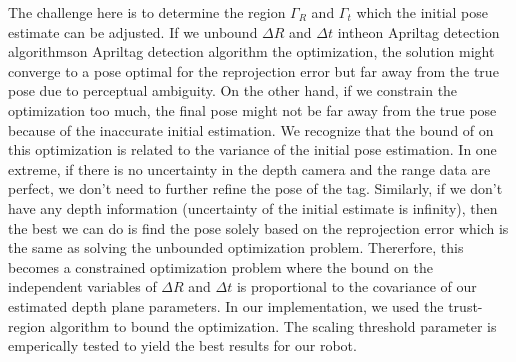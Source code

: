 The challenge here is to determine the region $\Gamma_R$ and $\Gamma_t$ which the initial pose estimate can be adjusted. If we unbound  $\Delta R$ and $\Delta t$ intheon Apriltag detection algorithmson Apriltag detection algorithm the optimization, the solution might converge to a pose optimal for the reprojection error but far away from the true pose due to perceptual ambiguity. On the other hand, if we constrain the optimization too much, the final pose might not be far away from the true pose because of the inaccurate initial estimation. We recognize that the bound of on this optimization is related to the variance of the initial pose estimation. In one extreme, if there is no uncertainty in the depth camera and the range data are perfect, we don't need to further refine the pose of the tag. Similarly, if we don't have any depth information (uncertainty of the initial estimate is infinity), then the best we can do is find the pose solely based on the reprojection error which is the same as solving the unbounded optimization problem. Thererfore, this becomes a constrained optimization problem where the bound on the independent variables of $\Delta R$ and $\Delta t$ is proportional to the covariance of our estimated depth plane parameters. In our implementation, we used the trust-region algorithm to bound the optimization. The scaling threshold parameter is emperically tested to yield the best results for our robot. 
